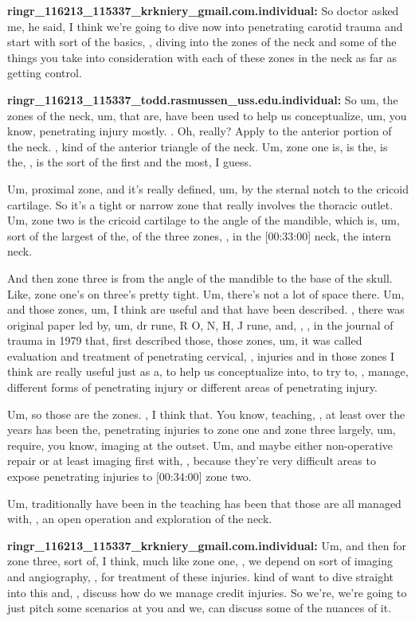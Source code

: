\documentclass[
]{book}
\begin{document}
\textbf{ringr\_116213\_115337\_krkniery\_gmail.com.individual:} So doctor asked
me, he said, I think we're going to dive now into penetrating carotid
trauma and start with sort of the basics, , diving into the zones of the
neck and some of the things you take into consideration with each of
these zones in the neck as far as getting control.

\textbf{ringr\_116213\_115337\_todd.rasmussen\_uss.edu.individual:} So um, the
zones of the neck, um, that are, have been used to help us
conceptualize, um, you know, penetrating injury mostly. . Oh, really?
Apply to the anterior portion of the neck. , kind of the anterior
triangle of the neck. Um, zone one is, is the, is the, , is the sort of
the first and the most, I guess.

Um, proximal zone, and it's really defined, um, by the sternal notch to
the cricoid cartilage. So it's a tight or narrow zone that really
involves the thoracic outlet. Um, zone two is the cricoid cartilage to
the angle of the mandible, which is, um, sort of the largest of the, of
the three zones, , in the {[}00:33:00{]} neck, the intern neck.

And then zone three is from the angle of the mandible to the base of the
skull. Like, zone one's on three's pretty tight. Um, there's not a lot
of space there. Um, and those zones, um, I think are useful and that
have been described. , there was original paper led by, um, dr rune, R
O, N, H, J rune, and, , , in the journal of trauma in 1979 that, first
described those, those zones, um, it was called evaluation and treatment
of penetrating cervical, , injuries and in those zones I think are
really useful just as a, to help us conceptualize into, to try to, ,
manage, different forms of penetrating injury or different areas of
penetrating injury.

Um, so those are the zones. , I think that. You know, teaching, , at
least over the years has been the, penetrating injuries to zone one and
zone three largely, um, require, you know, imaging at the outset. Um,
and maybe either non-operative repair or at least imaging first with, ,
because they're very difficult areas to expose penetrating injuries to
{[}00:34:00{]} zone two.

Um, traditionally have been in the teaching has been that those are all
managed with, , an open operation and exploration of the neck.

\textbf{ringr\_116213\_115337\_krkniery\_gmail.com.individual:} Um, and then for
zone three, sort of, I think, much like zone one, , we depend on sort of
imaging and angiography, , for treatment of these injuries. kind of want
to dive straight into this and, , discuss how do we manage credit
injuries. So we're, we're going to just pitch some scenarios at you and
we, can discuss some of the nuances of it.
\end{document}
